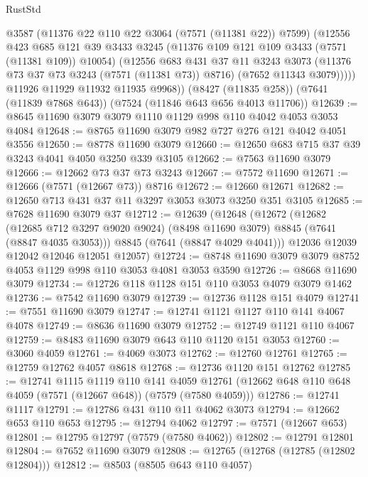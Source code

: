\begin{lexlean}{RustStd}
\begin{coremodule}
{\begin{coremodule}
{{{{{{{{{{{{{{{{{{{{{{{{{{{{{{{{            @3587
            (@11376 @22 @110 @22 @3064 (@7571 (@11381 @22)) @7599)
            (@12556
              @423
              @685
              @121
              @39
              @3433
              @3245
              (@11376 @109 @121 @109 @3433 (@7571 (@11381 @109)) @10054)
              (@12556
                @683
                @431
                @37
                @11
                @3243
                @3073
                (@11376 @73 @37 @73 @3243 (@7571 (@11381 @73)) @8716)
                (@7652 @11343 @3079)))))
        @11926
        @11929
        @11932
        @11935
        @9968))
    (@8427 (@11835 @258))
    (@7641 (@11839 @7868 @643))
    (@7524 (@11846 @643 @656 @4013 @11706))
@12639 := @8645 @11690 @3079 @3079 @1110 @1129 @998 @110 @4042 @4053 @3053 @4084
@12648 := @8765 @11690 @3079 @982 @727 @276 @121 @4042 @4051 @3556
@12650 := @8778 @11690 @3079
@12660 := @12650 @683 @715 @37 @39 @3243 @4041 @4050 @3250 @339 @3105
@12662 := @7563 @11690 @3079
@12666 := @12662 @73 @37 @73 @3243
@12667 := @7572 @11690
@12671 := @12666 (@7571 (@12667 @73)) @8716
@12672 := @12660 @12671
@12682 := @12650 @713 @431 @37 @11 @3297 @3053 @3073 @3250 @351 @3105
@12685 := @7628 @11690 @3079 @37
@12712 := @12639
    (@12648
      (@12672
        (@12682
          (@12685 @712 @3297 @9020 @9024)
          (@8498 @11690 @3079)
          @8845
          (@7641 (@8847 @4035 @3053)))
        @8845
        (@7641 (@8847 @4029 @4041)))
      @12036
      @12039
      @12042
      @12046
      @12051
      @12057)
@12724 := @8748 @11690 @3079 @3079 @8752 @4053 @1129 @998 @110 @3053 @4081 @3053 @3590
@12726 := @8668 @11690 @3079
@12734 := @12726 @118 @1128 @151 @110 @3053 @4079 @3079 @1462
@12736 := @7542 @11690 @3079
@12739 := @12736 @1128 @151 @4079
@12741 := @7551 @11690 @3079
@12747 := @12741 @1121 @1127 @110 @141 @4067 @4078
@12749 := @8636 @11690 @3079
@12752 := @12749 @1121 @110 @4067
@12759 := @8483 @11690 @3079 @643 @110 @1120 @151 @3053
@12760 := @3060 @4059
@12761 := @4069 @3073
@12762 := @12760 @12761
@12765 := @12759 @12762 @4057 @8618
@12768 := @12736 @1120 @151 @12762
@12785 := @12741
    @1115
    @1119
    @110
    @141
    @4059
    @12761
    (@12662 @648 @110 @648 @4059 (@7571 (@12667 @648)) (@7579 (@7580 @4059)))
@12786 := @12741 @1117
@12791 := @12786 @431 @110 @11 @4062 @3073
@12794 := @12662 @653 @110 @653
@12795 := @12794 @4062
@12797 := @7571 (@12667 @653)
@12801 := @12795 @12797 (@7579 (@7580 @4062))
@12802 := @12791 @12801
@12804 := @7652 @11690 @3079
@12808 := @12765 (@12768 (@12785 (@12802 @12804)))
@12812 := @8503 (@8505 @643 @110 @4057)
}}}}}}}}}}}}}}}}}}}}}}}}}}}}}}}}
\end{coremodule}}
\end{coremodule}
\end{lexlean}
